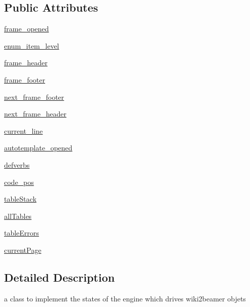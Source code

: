 \subsection*{\-Public \-Attributes}
\begin{DoxyCompactItemize}
\item 
\hyperlink{classuicilibris_1_1w2bstate_1_1w2bstate_aaea3f4b63a756e3bc11805579a6f2c38}{frame\-\_\-opened}
\item 
\hyperlink{classuicilibris_1_1w2bstate_1_1w2bstate_a6684365efb3566238e12c5e7baf7651b}{enum\-\_\-item\-\_\-level}
\item 
\hyperlink{classuicilibris_1_1w2bstate_1_1w2bstate_ae6b563780c0316dd38c06ed20a642db8}{frame\-\_\-header}
\item 
\hyperlink{classuicilibris_1_1w2bstate_1_1w2bstate_a3d398d18ac0f2c3a25f5356f8fa11349}{frame\-\_\-footer}
\item 
\hyperlink{classuicilibris_1_1w2bstate_1_1w2bstate_a4c486bfbf4660fda2a82ef3bd5eb9c4e}{next\-\_\-frame\-\_\-footer}
\item 
\hyperlink{classuicilibris_1_1w2bstate_1_1w2bstate_a6abacdcf64d784013b1061a704e02c93}{next\-\_\-frame\-\_\-header}
\item 
\hyperlink{classuicilibris_1_1w2bstate_1_1w2bstate_aa23a9d4e0aa9c43213b3c443c43a4bd6}{current\-\_\-line}
\item 
\hyperlink{classuicilibris_1_1w2bstate_1_1w2bstate_a7e48066fda9b91d0eb61f5c70c9ad9d0}{autotemplate\-\_\-opened}
\item 
\hyperlink{classuicilibris_1_1w2bstate_1_1w2bstate_a3b63fe2436935ae17f11a326fd487f4f}{defverbs}
\item 
\hyperlink{classuicilibris_1_1w2bstate_1_1w2bstate_aeca6c8c4eb68376df3bea3f6a0e0de75}{code\-\_\-pos}
\item 
\hyperlink{classuicilibris_1_1w2bstate_1_1w2bstate_ae69b1438cdfd3c1ee2f69ec9f3ad3783}{table\-Stack}
\item 
\hyperlink{classuicilibris_1_1w2bstate_1_1w2bstate_a1b39bf025eb036df29c6ea55cf1542d2}{all\-Tables}
\item 
\hyperlink{classuicilibris_1_1w2bstate_1_1w2bstate_ab63a8d91dd1ea7b1ee131b39e7bd4a77}{table\-Errors}
\item 
\hyperlink{classuicilibris_1_1w2bstate_1_1w2bstate_a5618cf1f6eaaabbbcd41a7d19ec80d2c}{current\-Page}
\end{DoxyCompactItemize}


\subsection{\-Detailed \-Description}
a class to implement the states of the engine which drives wiki2beamer objets 

